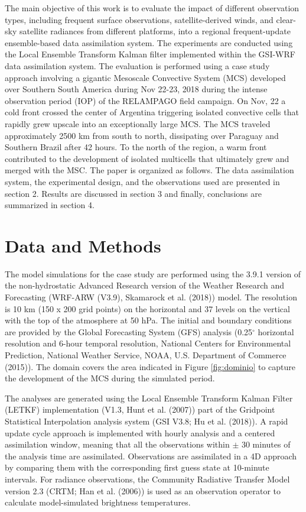 \documentclass[final,5p,times,twocolumn,authoryear]{elsarticle} %
\begin{document}
The main objective of this work is to evaluate the impact of different observation types, including frequent surface observations, satellite-derived winds, and clear-sky satellite radiances from different platforms, into a regional frequent-update ensemble-based data assimilation system.
The experiments are conducted using the Local Ensemble Transform Kalman filter implemented within the GSI-WRF data assimilation system.
The evaluation is performed using a case study approach involving a gigantic Mesoscale Convective System (MCS) developed over Southern South America during Nov 22-23, 2018 during the intense observation period (IOP) of the RELAMPAGO field campaign.
On Nov, 22 a cold front crossed the center of Argentina triggering isolated convective cells that rapidly grew upscale into an exceptionally large MCS.
The MCS traveled approximately 2500 km from south to north, dissipating over Paraguay and Southern Brazil after 42 hours.
To the north of the region, a warm front contributed to the development of isolated multicells that ultimately grew and merged with the MSC.
The paper is organized as follows. The data assimilation system, the experimental design, and the observations used are presented in section 2. Results are discussed in section 3 and finally, conclusions are summarized in section 4.

\hypertarget{data-and-methods}{%
\section{Data and Methods}\label{data-and-methods}}

The model simulations for the case study are performed using the 3.9.1 version of the non-hydrostatic Advanced Research version of the Weather Research and Forecasting (WRF-ARW (V3.9), Skamarock et al. (2018)) model.
The resolution is 10 km (150 x 200 grid points) on the horizontal and 37 levels on the vertical with the top of the atmosphere at 50 hPa.
The initial and boundary conditions are provided by the Global Forecasting System (GFS) analysis (0.25\(^{\circ}\) horizontal resolution and 6-hour temporal resolution, National Centers for Environmental Prediction, National Weather Service, NOAA, U.S. Department of Commerce (2015)).
The domain covers the area indicated in Figure \ref{fig:dominio} to capture the development of the MCS during the simulated period.

The analyses are generated using the Local Ensemble Transform Kalman Filter (LETKF) implementation (V1.3, Hunt et al. (2007)) part of the Gridpoint Statistical Interpolation analysis system (GSI V3.8; Hu et al. (2018)).
A rapid update cycle approach is implemented with hourly analysis and a centered assimilation window, meaning that all the observations within \(\pm\) 30 minutes of the analysis time are assimilated.
Observations are assimilated in a 4D approach by comparing them with the corresponding first guess state at 10-minute intervals.
For radiance observations, the Community Radiative Transfer Model version 2.3 (CRTM; Han et al. (2006)) is used as an observation operator to calculate model-simulated brightness temperatures.
\end{document}
